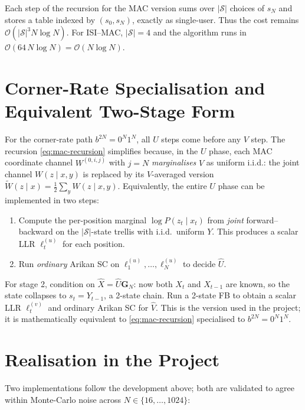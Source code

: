\documentclass[11pt]{article}
\newcommand{\bbY}{Y}
\newcommand{\bbU}{U}
\newcommand{\bbX}{X}
\newcommand{\bbV}{V}
\newcommand{\BigOh}{\mathcal{O}}
\begin{document}
Each step of the recursion for the MAC version sums over $|\mathcal{S}|$
choices of $s_N$ and stores a table indexed by $(s_0, s_N)$, exactly as
single-user.  Thus the cost remains
\(\BigOh(|\mathcal{S}|^3 N \log N)\).
For ISI--MAC, $|\mathcal{S}|=4$ and the algorithm runs in
$\BigOh(64\, N\log N) = \BigOh(N\log N)$.

\section{Corner-Rate Specialisation and Equivalent Two-Stage Form}

For the corner-rate path $b^{2N}=0^N 1^N$, all $\bbU$ steps come before any
$\bbV$ step.  The recursion \eqref{eq:mac-recursion} simplifies because, in
the $\bbU$ phase, each MAC coordinate channel $W^{(0,i,j)}$ with $j=N$
\emph{marginalises} $\bbV$ as uniform i.i.d.: the joint channel
$W(z\mid x,y)$ is replaced by its $\bbV$-averaged version
\(
   \tilde W(z\mid x) = \tfrac{1}{2}\sum_y W(z\mid x, y).
\)
Equivalently, the entire $\bbU$ phase can be implemented in two steps:
\begin{enumerate}[leftmargin=*]
\item[\textbf{(a)}] Compute the per-position marginal
      $\log P(z_t \mid x_t)$ from \emph{joint} forward--backward on the
      $|\mathcal{S}|$-state trellis with i.i.d.\ uniform $\bbY$.  This
      produces a scalar LLR $\ell^{(u)}_t$ for each position.
\item[\textbf{(b)}] Run \emph{ordinary} Arikan SC on $\ell^{(u)}_1, \ldots,
      \ell^{(u)}_N$ to decide $\hat{\bbU}$.
\end{enumerate}
For stage 2, condition on $\hat{\bbX} = \hat{\bbU}\mathbf{G}_N$: now both $X_t$ and
$X_{t-1}$ are known, so the state collapses to $s_t = Y_{t-1}$, a 2-state
chain.  Run a 2-state FB to obtain a scalar LLR $\ell^{(v)}_t$ and
ordinary Arikan SC for $\hat{\bbV}$.  This is the version used in the
project; it is mathematically equivalent to \eqref{eq:mac-recursion}
specialised to $b^{2N}=0^N 1^N$.

\section{Realisation in the Project}

Two implementations follow the development above; both are validated to
agree within Monte-Carlo noise across $N\in\{16,\ldots,1024\}$:
\end{document}
